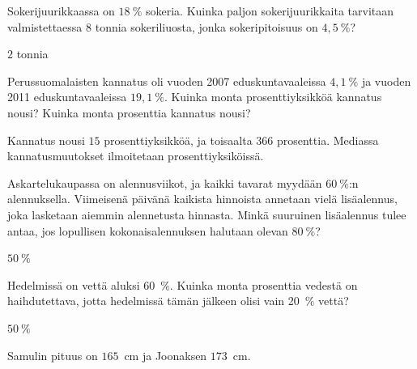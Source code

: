 \begin{tehtavasivu}
\begin{tehtava}
    Sokerijuurikkaassa on $18~\%$ sokeria. Kuinka paljon sokerijuurikkaita tarvitaan valmistettaessa
    $8$ tonnia sokeriliuosta, jonka sokeripitoisuus on $4,5~\%$?
    \begin{vastaus}
        $2$ tonnia
    \end{vastaus}
\end{tehtava}

\begin{tehtava}
    Perussuomalaisten kannatus oli vuoden 2007 eduskuntavaaleissa $4,1~\%$ ja 
    vuoden 2011 eduskuntavaaleissa $19,1~\%$. Kuinka monta prosenttiyksikköä 
    kannatus nousi? Kuinka monta prosenttia kannatus nousi?
    \begin{vastaus}
        Kannatus nousi $15$ prosenttiyksikköä, ja toisaalta $366$ prosenttia.
        Mediassa kannatusmuutokset ilmoitetaan prosenttiyksiköissä.
    \end{vastaus}
\end{tehtava}

\begin{tehtava}
    Askartelukaupassa on alennusviikot, ja kaikki tavarat myydään $60~\%$:n 
    alennuksella. Viimeisenä päivänä kaikista hinnoista annetaan vielä 
    lisäalennus, joka lasketaan aiemmin alennetusta hinnasta. Minkä suuruinen 
    lisäalennus tulee antaa, jos lopullisen kokonaisalennuksen halutaan olevan $80~\%$?
    \begin{vastaus}
        $50~\%$
    \end{vastaus}
\end{tehtava}

\begin{tehtava}
    Hedelmissä on vettä aluksi 60~\%. Kuinka monta prosenttia vedestä on 
    haihdutettava, jotta hedelmissä tämän jälkeen olisi vain 20~\% vettä?
    \begin{vastaus}
        $50~\%$
    \end{vastaus}
\end{tehtava}


\begin{tehtava}
    Samulin pituus on $165$~cm ja Joonaksen $173$~cm.
    \begin{alakohdat}
    \end{alakohdat}
    \begin{vastaus}
        \begin{alakohdat}
        \end{alakohdat}
    \end{vastaus}
\end{tehtava}


\end{tehtavasivu}
